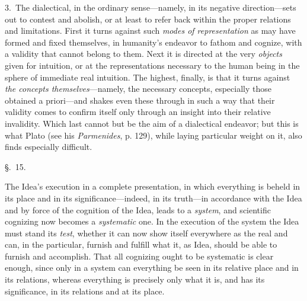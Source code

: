 \documentclass[12pt,a4paper]{book}
\begin{document}
3.~The dialectical, in the ordinary sense---namely, in its negative direction---sets out
to contest and abolish, or at least to refer back within the proper relations and
limitations. First it turns against such \emph{modes of representation} as may have
formed and fixed themselves, in humanity's endeavor to fathom and cognize, with a
validity that cannot belong to them. Next it is directed at the very \emph{objects}
given for intuition, or at the representations necessary to the human being in the
sphere of immediate real intuition. The highest, finally, is that it turns against
\emph{the concepts themselves}---namely, the necessary concepts, especially those
obtained a priori---and shakes even these through in such a way that their validity
comes to confirm itself only through an insight into their relative invalidity. Which
last cannot but be the aim of a dialectical endeavor; but this is what Plato (see his
\textit{Parmenides}, p. 129), while laying particular weight on it, also finds
especially difficult.

\begin{center}\large\S.~15.\end{center}
The Idea's execution in a complete presentation, in which everything is beheld in its
place and in its significance---indeed, in its truth---in accordance with the Idea and
by force of the cognition of the Idea, leads to a \emph{system}, and scientific
cognizing now becomes a \emph{systematic} one. In the execution of the system the Idea
must stand its \emph{test}, whether it can now show itself everywhere as the real and
can, in the particular, furnish and fulfill what it, as Idea, should be able to furnish
and accomplish. That all cognizing ought to be systematic is clear enough, since only in
a system can everything be seen in its relative place and in its relations, whereas
everything is precisely only what it is, and has its significance, in its relations and
at its place.
\end{document}
